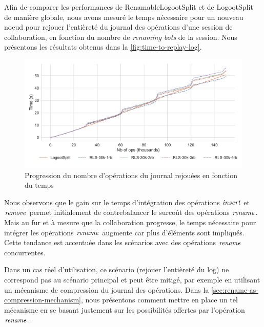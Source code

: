 Afin de comparer les performances de RenamableLogootSplit et de LogootSplit de manière globale, nous avons mesuré le temps nécessaire pour un nouveau noeud pour rejouer l'entièreté du journal des opérations d'une session de collaboration, en fonction du nombre de \emph{renaming bots} de la session.
Nous présentons les résultats obtenus dans la \autoref{fig:time-to-replay-log}.

\begin{figure}[!ht]
  \centering
  \includegraphics[width=\columnwidth]{img/replay-log-30k-2022-10-27}
  \caption{Progression du nombre d'opérations du journal rejouées en fonction du temps}
  \label{fig:time-to-replay-log}
\end{figure}

Nous observons que le gain sur le temps d'intégration des opérations $\mathit{insert}$ et $\mathit{remove}$ permet initialement de contrebalancer le surcoût des opérations $\mathit{rename}$.
Mais au fur et à mesure que la collaboration progresse, le temps nécessaire pour intégrer les opérations $\mathit{rename}$ augmente car plus d'éléments sont impliqués.
Cette tendance est accentuée dans les scénarios avec des opérations $\mathit{rename}$ concurrentes.

Dans un cas réel d'utilisation, ce scénario (\ie rejouer l'entièreté du log) ne correspond pas au scénario principal et peut être mitigé, par exemple en utilisant un mécanisme de compression du journal des opérations.
Dans la \autoref{sec:rename-as-compression-mechanism}, nous présentons comment mettre en place un tel mécanisme en se basant justement sur les possibilités offertes par l'opération $\mathit{rename}$.
